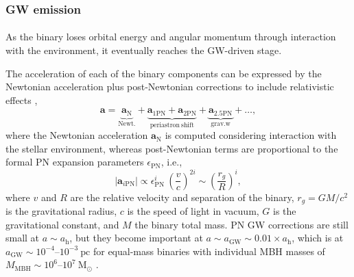 \documentclass[a4paper,12pt]{article}
\begin{document}
\subsubsection{GW emission}

\paragraph{}
As the binary loses orbital energy and angular momentum through interaction with the environment, it eventually reaches the GW-driven stage. 

The acceleration of each of the binary components can be expressed by the Newtonian acceleration plus post-Newtonian corrections to include relativistic effects \cite{kupi2006dynamics,damour1981radiation},
\begin{equation}
\mathbf{a}=\underbrace{\mathbf{a}_{\mathrm{N}}}_{\mathrm{Newt.}}+\underbrace{\mathbf{a}_{\mathrm{1PN}}+\mathbf{a}_{\mathrm{2PN}}}_{\mathrm{periastron~shift}}+\underbrace{\mathbf{a}_{\mathrm{2.5PN}}}_{\mathrm{grav. w}}+\ldots,
\label{eq:PNacceleration}
\end{equation}
where the Newtonian acceleration $\textbf{a}_{\mathrm{N}}$ is computed considering interaction with the stellar environment, whereas post-Newtonian terms are proportional to the formal PN expansion parameters $\epsilon_{\mathrm{PN}}$, i.e.,
\begin{equation}
|\textbf{a}_{i\mathrm{PN}}| \propto \epsilon^{i}_{\mathrm{PN}}~\left(\frac{v}{c}\right)^{2i} \sim \left(\frac{r_{g}}{R}\right)^{i},
\label{eq:PNepsilon}
\end{equation}
where $v$ and $R$ are the relative velocity and separation of the binary, $r_{g}=GM/c^{2}$ is the gravitational radius, $c$ is the speed of light in vacuum, $G$ is the gravitational constant, and $M$ the binary total mass. PN GW corrections are still small at $a\sim a_{\mathrm{h}}$, but they become important at  $a\sim a_{\mathrm{GW}}\sim0.01 \times a_\mathrm{h}$\cite{rantala2018formation,quinlan1996dynamical}, which is at $a_{\mathrm{GW}}\sim10^{-4}$--$10^{-3}~\mathrm{pc}$ for equal-mass binaries with individual MBH masses of $M_{\mathrm{MBH}}\sim10^{6}$--$10^{7}~\mathrm{M}_{\odot}$ \cite{amaro2023astrophysics}.
\end{document}
